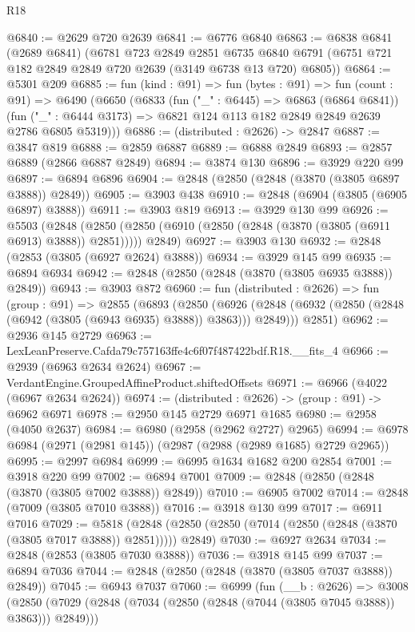 \begin{lexlean}{R18}
\begin{coremodule}
@6840 := @2629 @720 @2639
@6841 := @6776 @6840
@6863 := @6838
    @6841
    (@2689 @6841)
    (@6781
      @723
      @2849
      @2851
      @6735
      @6840
      @6791
      (@6751 @721 @182 @2849 @2849 @720 @2639 (@3149 @6738 @13 @720) @6805))
@6864 := @5301 @209
@6885 := fun (kind : @91) =>
  fun (bytes : @91) =>
  fun (count : @91) =>
  @6490
    (@6650
      (@6833
        (fun ("_" : @6445) => @6863 (@6864 @6841))
        (fun ("_" : @6444 @3173) => @6821 @124 @113 @182 @2849 @2849 @2639 @2786 @6805 @5319)))
@6886 := (distributed : @2626) -> @2847
@6887 := @3847 @819
@6888 := @2859 @6887
@6889 := @6888 @2849
@6893 := @2857 @6889 (@2866 @6887 @2849)
@6894 := @3874 @130
@6896 := @3929 @220 @99
@6897 := @6894 @6896
@6904 := @2848 (@2850 (@2848 (@3870 (@3805 @6897 @3888)) @2849))
@6905 := @3903 @438
@6910 := @2848 (@6904 (@3805 (@6905 @6897) @3888))
@6911 := @3903 @819
@6913 := @3929 @130 @99
@6926 := @5503
    (@2848 (@2850 (@2850 (@6910 (@2850 (@2848 (@3870 (@3805 (@6911 @6913) @3888)) @2851))))) @2849)
@6927 := @3903 @130
@6932 := @2848 (@2853 (@3805 (@6927 @2624) @3888))
@6934 := @3929 @145 @99
@6935 := @6894 @6934
@6942 := @2848 (@2850 (@2848 (@3870 (@3805 @6935 @3888)) @2849))
@6943 := @3903 @872
@6960 := fun (distributed : @2626) =>
  fun (group : @91) =>
  @2855
    (@6893
      (@2850
        (@6926 (@2848 (@6932 (@2850 (@2848 (@6942 (@3805 (@6943 @6935) @3888)) @3863))) @2849)))
      @2851)
@6962 := @2936 @145 @2729
@6963 := LexLeanPreserve.Cafda79c757163ffe4c6f07f487422bdf.R18.__fits_4
@6966 := @2939 (@6963 @2634 @2624)
@6967 := VerdantEngine.GroupedAffineProduct.shiftedOffsets
@6971 := @6966 (@4022 (@6967 @2634 @2624))
@6974 := (distributed : @2626) -> (group : @91) -> @6962 @6971
@6978 := @2950 @145 @2729 @6971 @1685
@6980 := @2958 (@4050 @2637)
@6984 := @6980 (@2958 (@2962 @2727) @2965)
@6994 := @6978 @6984 (@2971 (@2981 @145)) (@2987 (@2988 (@2989 @1685) @2729 @2965))
@6995 := @2997 @6984
@6999 := @6995 @1634 @1682 @200 @2854
@7001 := @3918 @220 @99
@7002 := @6894 @7001
@7009 := @2848 (@2850 (@2848 (@3870 (@3805 @7002 @3888)) @2849))
@7010 := @6905 @7002
@7014 := @2848 (@7009 (@3805 @7010 @3888))
@7016 := @3918 @130 @99
@7017 := @6911 @7016
@7029 := @5818
    (@2848 (@2850 (@2850 (@7014 (@2850 (@2848 (@3870 (@3805 @7017 @3888)) @2851))))) @2849)
@7030 := @6927 @2634
@7034 := @2848 (@2853 (@3805 @7030 @3888))
@7036 := @3918 @145 @99
@7037 := @6894 @7036
@7044 := @2848 (@2850 (@2848 (@3870 (@3805 @7037 @3888)) @2849))
@7045 := @6943 @7037
@7060 := @6999
    (fun (__b : @2626) =>
    @3008
      (@2850 (@7029 (@2848 (@7034 (@2850 (@2848 (@7044 (@3805 @7045 @3888)) @3863))) @2849)))

\end{coremodule}
\end{lexlean}
